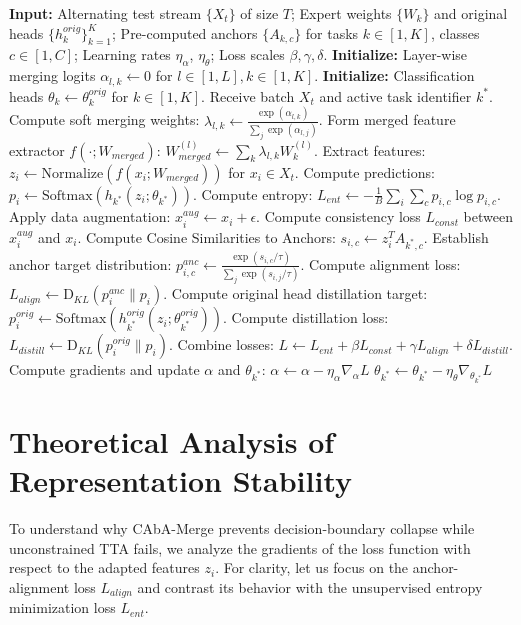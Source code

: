 \documentclass{article}
\theoremstyle{plain}
\theoremstyle{definition}
\theoremstyle{remark}
\begin{document}
\begin{algorithm}[!t]
\caption{CAbA-Merge: Test-Time Adaptation Loop}
\label{alg:caba}
\begin{algorithmic}[1]
\STATE \textbf{Input:} Alternating test stream $\{X_t\}$ of size $T$; Expert weights $\{W_k\}$ and original heads $\{h_k^{orig}\}_{k=1}^K$; Pre-computed anchors $\{A_{k, c}\}$ for tasks $k \in [1, K]$, classes $c \in [1, C]$; Learning rates $\eta_\alpha$, $\eta_\theta$; Loss scales $\beta, \gamma, \delta$.
\STATE \textbf{Initialize:} Layer-wise merging logits $\alpha_{l, k} \gets 0$ for $l \in [1, L], k \in [1, K]$.
\STATE \textbf{Initialize:} Classification heads $\theta_k \gets \theta_k^{orig}$ for $k \in [1, K]$.
    \STATE Receive batch $X_t$ and active task identifier $k^*$.
    \STATE Compute soft merging weights: $\lambda_{l, k} \gets \frac{\exp(\alpha_{l, k})}{\sum_j \exp(\alpha_{l, j})}$.
    \STATE Form merged feature extractor $f(\cdot; W_{merged})$: $W_{merged}^{(l)} \gets \sum_k \lambda_{l, k} W_k^{(l)}$.
    \STATE Extract features: $z_i \gets \text{Normalize}(f(x_i; W_{merged}))$ for $x_i \in X_t$.
    \STATE Compute predictions: $p_i \gets \text{Softmax}(h_{k^*}(z_i; \theta_{k^*}))$.
    \STATE Compute entropy: $L_{ent} \gets -\frac{1}{B}\sum_{i} \sum_c p_{i, c} \log p_{i, c}$.
    \STATE Apply data augmentation: $x_i^{aug} \gets x_i + \epsilon$.
    \STATE Compute consistency loss $L_{const}$ between $x_i^{aug}$ and $x_i$.
    \STATE Compute Cosine Similarities to Anchors: $s_{i, c} \gets z_i^T A_{k^*, c}$.
    \STATE Establish anchor target distribution: $p_{i, c}^{anc} \gets \frac{\exp(s_{i, c}/\tau)}{\sum_j \exp(s_{i, j}/\tau)}$.
    \STATE Compute alignment loss: $L_{align} \gets \text{D}_{KL}(p_i^{anc} \parallel p_i)$.
    \STATE Compute original head distillation target: $p_i^{orig} \gets \text{Softmax}(h_{k^*}^{orig}(z_i; \theta_{k^*}^{orig}))$.
    \STATE Compute distillation loss: $L_{distill} \gets \text{D}_{KL}(p_i^{orig} \parallel p_i)$.
    \STATE Combine losses: $L \gets L_{ent} + \beta L_{const} + \gamma L_{align} + \delta L_{distill}$.
    \STATE Compute gradients and update $\alpha$ and $\theta_{k^*}$:
    \STATE \quad $\alpha \gets \alpha - \eta_\alpha \nabla_\alpha L$
    \STATE \quad $\theta_{k^*} \gets \theta_{k^*} - \eta_\theta \nabla_{\theta_{k^*}} L$
\ENDFOR
\end{algorithmic}
\end{algorithm}

\section{Theoretical Analysis of Representation Stability}
\label{sec:theory}
To understand why CAbA-Merge prevents decision-boundary collapse while unconstrained TTA fails, we analyze the gradients of the loss function with respect to the adapted features $z_i$. For clarity, let us focus on the anchor-alignment loss $L_{align}$ and contrast its behavior with the unsupervised entropy minimization loss $L_{ent}$.
\end{document}
